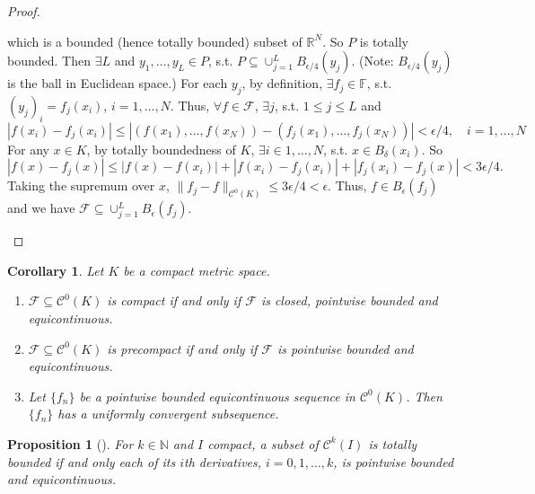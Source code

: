 \documentclass[12pt]{article}
\theoremstyle{plain}
\newtheorem*{prop}{Proposition}
\newtheorem*{corollary}{Corollary}
\theoremstyle{definition}
\begin{document}
\begin{proof}
\begin{description}
        which is a bounded (hence totally bounded) subset of $\mathbb{R}^N$.
        So $P$ is totally bounded.
        Then $\exists L$ and $y_1,\ldots,y_L\in P$, s.t. $P\subseteq\cup_{j=1}^L
        B_{\epsilon/4}(y_j)$. (Note: $B_{\epsilon/4}(y_j)$ is the ball in
        Euclidean space.)
        For each $y_j$, by definition, $\exists f_j\in\mathbb{F}$, s.t.
        $(y_j)_i=f_j(x_i)$, $i=1,\ldots,N$.
        Thus, $\forall f\in\mathcal{F}$, $\exists j$, s.t. $1\leq j\leq L$ and
        $$|f(x_i)-f_j(x_i)|\leq|(f(x_1),\ldots,f(x_N))-(f_j(x_1),\ldots,f_j(x_N))|<\epsilon/4,\quad
        i=1,\ldots,N$$
        For any $x\in K$, by totally boundedness of $K$, $\exists i\in1,\ldots,N$,
        s.t. $x\in
        B_\delta(x_i)$.
        So
        $$|f(x)-f_j(x)|\leq
        |f(x)-f(x_i)|+|f(x_i)-f_j(x_i)|+|f_j(x_i)-f_j(x)|<3\epsilon/4.$$
        Taking the supremum over $x$, $\|f_j-f\|_{\mathcal{C}^0(K)}\leq
        3\epsilon/4<\epsilon$.
        Thus, $f\in B_\epsilon(f_j)$ and we have
        $\mathcal{F}\subseteq\cup_{j=1}^L B_\epsilon(f_j)$.
    \end{description}
\end{proof}
\begin{corollary}
    Let $K$ be a compact metric space.
    \begin{enumerate}
        \item $\mathcal{F}\subseteq \mathcal{C}^0(K)$ is compact if and only if
        $\mathcal{F}$ is closed, pointwise bounded and equicontinuous.
        \item $\mathcal{F}\subseteq\mathcal{C}^0(K)$ is precompact if and only
        if $\mathcal{F}$ is pointwise bounded and equicontinuous.
        \item Let $\{f_n\}$ be a pointwise bounded equicontinuous sequence in
        $\mathcal{C}^0(K)$.
        Then $\{f_n\}$ has a uniformly convergent subsequence.
    \end{enumerate}
\end{corollary}

\begin{prop}[]
    For $k\in\mathbb{N}$ and $I$ compact, a subset of $\mathcal{C}^k(I)$ is
    totally bounded if and only each of its $i$th derivatives, $i=0,1,\ldots,k$, is
    pointwise bounded and equicontinuous.
\end{prop}
\end{document}

